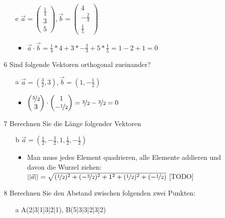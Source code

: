 \documentclass{article}
\begin{document}
\begin{itemize}
\begin{itemize}
\begin{itemize}
			\end{itemize}
			\item[e]{$\vec{a}=\begin{pmatrix} \frac{1}{4} \\ 3 \\ 5 \end{pmatrix}, \vec{b}=\begin{pmatrix} 4 \\ -\frac{2}{3} \\ \frac{1}{5} \end{pmatrix}$}
			\begin{itemize}
				\item{$\vec{a}\cdot\vec{b}=\frac{1}{4}*4+3*-\frac{2}{3}+5*\frac{1}{5}=1-2+1=0$}
			\end{itemize}
		\end{itemize}
		\item[6]{Sind folgende Vektoren orthogonal zueinander?}
		\begin{itemize}
			\item[a]{$\vec{a}=(\frac{3}{2}, 3), \vec{b}=(1, -\frac{1}{2})$}
			\begin{itemize}
				\item{$\begin{pmatrix} \nicefrac{3}{2} \\ 3 \end{pmatrix}\cdot \begin{pmatrix} 1 \\ -\nicefrac{1}{2} \end{pmatrix}=\nicefrac{3}{2}-\nicefrac{3}{2}=0$}
			\end{itemize}
		\end{itemize}
		\item[7]{Berechnen Sie die Länge folgender Vektoren}
		\begin{itemize}
			\item[b]{$\vec{a}=(\frac{1}{2}, -\frac{3}{2}, 1, \frac{1}{2}, -\frac{1}{2})$}
			\begin{itemize}
				\item{Man muss jedes Element quadrieren, alle Elemente addieren und davon die Wurzel ziehen: $||\vec{a}||=\sqrt{(\nicefrac{1}{2})^2+(-\nicefrac{3}{2})^2+1^2+(\nicefrac{1}{2})^2+(-\nicefrac{1}{2})}$ [TODO]}
			\end{itemize}
		\end{itemize}
		\item[8]{Berechnen Sie den Abstand zwischen folgenden zwei Punkten:}
		\begin{itemize}
			\item[a]{A(2|3|1|3|2|1), B(5|3|3|2|3|2)}

\end{itemize}
\end{itemize}
\end{document}
